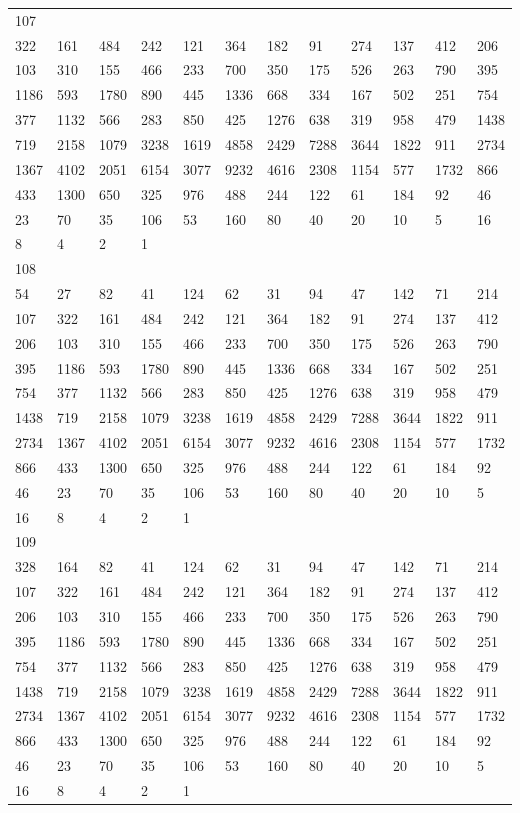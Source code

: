 \begin{longtable}{llllllllllll}
107&&&&&&&&&&&\\
322& 161& 484& 242& 121& 364& 182& 91& 274& 137& 412& 206\\
103& 310& 155& 466& 233& 700& 350& 175& 526& 263& 790& 395\\
1186& 593& 1780& 890& 445& 1336& 668& 334& 167& 502& 251& 754\\
377& 1132& 566& 283& 850& 425& 1276& 638& 319& 958& 479& 1438\\
719& 2158& 1079& 3238& 1619& 4858& 2429& 7288& 3644& 1822& 911& 2734\\
1367& 4102& 2051& 6154& 3077& 9232& 4616& 2308& 1154& 577& 1732& 866\\
433& 1300& 650& 325& 976& 488& 244& 122& 61& 184& 92& 46\\
23& 70& 35& 106& 53& 160& 80& 40& 20& 10& 5& 16\\
8& 4& 2& 1& \\

108&&&&&&&&&&&\\
54& 27& 82& 41& 124& 62& 31& 94& 47& 142& 71& 214\\
107& 322& 161& 484& 242& 121& 364& 182& 91& 274& 137& 412\\
206& 103& 310& 155& 466& 233& 700& 350& 175& 526& 263& 790\\
395& 1186& 593& 1780& 890& 445& 1336& 668& 334& 167& 502& 251\\
754& 377& 1132& 566& 283& 850& 425& 1276& 638& 319& 958& 479\\
1438& 719& 2158& 1079& 3238& 1619& 4858& 2429& 7288& 3644& 1822& 911\\
2734& 1367& 4102& 2051& 6154& 3077& 9232& 4616& 2308& 1154& 577& 1732\\
866& 433& 1300& 650& 325& 976& 488& 244& 122& 61& 184& 92\\
46& 23& 70& 35& 106& 53& 160& 80& 40& 20& 10& 5\\
16& 8& 4& 2& 1& \\

109&&&&&&&&&&&\\
328& 164& 82& 41& 124& 62& 31& 94& 47& 142& 71& 214\\
107& 322& 161& 484& 242& 121& 364& 182& 91& 274& 137& 412\\
206& 103& 310& 155& 466& 233& 700& 350& 175& 526& 263& 790\\
395& 1186& 593& 1780& 890& 445& 1336& 668& 334& 167& 502& 251\\
754& 377& 1132& 566& 283& 850& 425& 1276& 638& 319& 958& 479\\
1438& 719& 2158& 1079& 3238& 1619& 4858& 2429& 7288& 3644& 1822& 911\\
2734& 1367& 4102& 2051& 6154& 3077& 9232& 4616& 2308& 1154& 577& 1732\\
866& 433& 1300& 650& 325& 976& 488& 244& 122& 61& 184& 92\\
46& 23& 70& 35& 106& 53& 160& 80& 40& 20& 10& 5\\
16& 8& 4& 2& 1& \\


\end{longtable}
